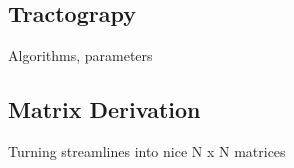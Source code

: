 \documentclass{frontiersSCNS} %
\begin{document}
\subsection{Tractograpy}
Algorithms, parameters

\subsection{Matrix Derivation}
Turning streamlines into nice N x N matrices




\end{document}
